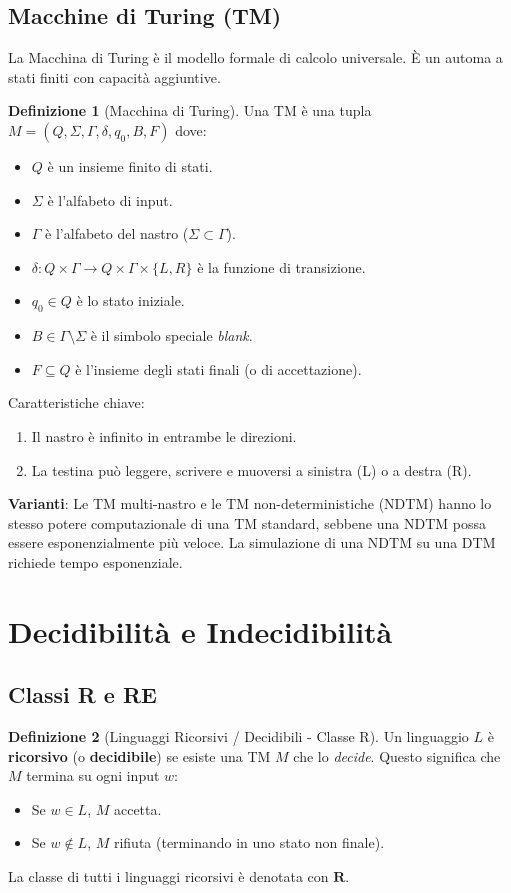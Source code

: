 \documentclass[a4paper]{article}
\theoremstyle{definition} %
\newtheorem{definition}{Definizione}
\begin{document}
\subsection{Macchine di Turing (TM)}
La Macchina di Turing è il modello formale di calcolo universale. È un automa a stati finiti con capacità aggiuntive.
\begin{definition}[Macchina di Turing]
Una TM è una tupla $M = (Q, \Sigma, \Gamma, \delta, q_0, B, F)$ dove:
\begin{itemize}
    \item $Q$ è un insieme finito di stati.
    \item $\Sigma$ è l'alfabeto di input.
    \item $\Gamma$ è l'alfabeto del nastro ($\Sigma \subset \Gamma$).
    \item $\delta: Q \times \Gamma \to Q \times \Gamma \times \{L, R\}$ è la funzione di transizione.
    \item $q_0 \in Q$ è lo stato iniziale.
    \item $B \in \Gamma \setminus \Sigma$ è il simbolo speciale \emph{blank}.
    \item $F \subseteq Q$ è l'insieme degli stati finali (o di accettazione).
\end{itemize}
\end{definition}
Caratteristiche chiave:
\begin{enumerate}
    \item Il nastro è infinito in entrambe le direzioni.
    \item La testina può leggere, scrivere e muoversi a sinistra (L) o a destra (R).
\end{enumerate}
\textbf{Varianti}: Le TM multi-nastro e le TM non-deterministiche (NDTM) hanno lo stesso potere computazionale di una TM standard, sebbene una NDTM possa essere esponenzialmente più veloce. La simulazione di una NDTM su una DTM richiede tempo esponenziale.

\section{Decidibilità e Indecidibilità}
\subsection{Classi R e RE}
\begin{definition}[Linguaggi Ricorsivi / Decidibili - Classe R]
Un linguaggio $L$ è \textbf{ricorsivo} (o \textbf{decidibile}) se esiste una TM $M$ che lo \emph{decide}. Questo significa che $M$ termina su ogni input $w$:
\begin{itemize}
    \item Se $w \in L$, $M$ accetta.
    \item Se $w \notin L$, $M$ rifiuta (terminando in uno stato non finale).
\end{itemize}
La classe di tutti i linguaggi ricorsivi è denotata con $\mathbf{R}$.
\end{definition}
\end{document}
